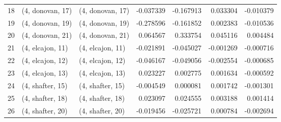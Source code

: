 \begin{tabular}{lllrrrr}
18 &  (4, donovan, 17) &  (4, donovan, 17) & -0.037339 & -0.167913 &   0.033304 & -0.010379 \\
19 &  (4, donovan, 19) &  (4, donovan, 19) & -0.278596 & -0.161852 &   0.002383 & -0.010536 \\
20 &  (4, donovan, 21) &  (4, donovan, 21) &  0.064567 &  0.333754 &   0.045116 &  0.004484 \\
21 &  (4, elcajon, 11) &  (4, elcajon, 11) & -0.021891 & -0.045027 &  -0.001269 & -0.000716 \\
22 &  (4, elcajon, 12) &  (4, elcajon, 12) & -0.046167 & -0.049056 &  -0.002554 & -0.000685 \\
23 &  (4, elcajon, 13) &  (4, elcajon, 13) &  0.023227 &  0.002775 &   0.001634 & -0.000592 \\
24 &  (4, shafter, 15) &  (4, shafter, 15) & -0.004549 &  0.000081 &   0.001742 & -0.001301 \\
25 &  (4, shafter, 18) &  (4, shafter, 18) &  0.023097 &  0.024555 &   0.003188 &  0.001414 \\
26 &  (4, shafter, 20) &  (4, shafter, 20) & -0.019456 & -0.025721 &   0.000784 & -0.002694 \\
\bottomrule
\end{tabular}
